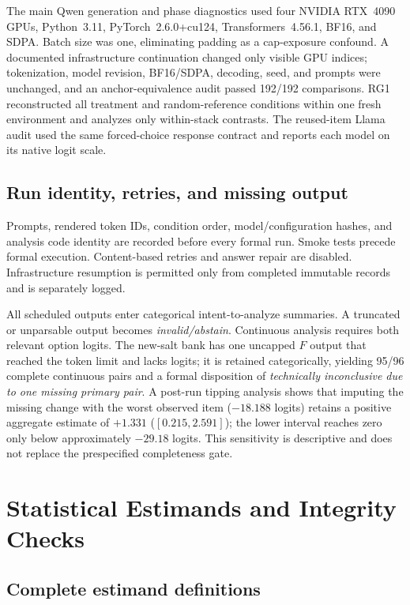 \documentclass[letterpaper]{article}
\begin{document}
The main Qwen generation and phase diagnostics used four NVIDIA RTX~4090 GPUs, Python~3.11, PyTorch~2.6.0+cu124, Transformers~4.56.1, BF16, and SDPA.  Batch size was one, eliminating padding as a cap-exposure confound.  A documented infrastructure continuation changed only visible GPU indices; tokenization, model revision, BF16/SDPA, decoding, seed, and prompts were unchanged, and an anchor-equivalence audit passed 192/192 comparisons.  RG1 reconstructed all treatment and random-reference conditions within one fresh environment and analyzes only within-stack contrasts.  The reused-item Llama audit used the same forced-choice response contract and reports each model on its native logit scale.

\subsection{Run identity, retries, and missing output}

Prompts, rendered token IDs, condition order, model/configuration hashes, and analysis code identity are recorded before every formal run.  Smoke tests precede formal execution.  Content-based retries and answer repair are disabled.  Infrastructure resumption is permitted only from completed immutable records and is separately logged.

All scheduled outputs enter categorical intent-to-analyze summaries.  A truncated or unparsable output becomes \emph{invalid/abstain}.  Continuous analysis requires both relevant option logits.  The new-salt bank has one uncapped $F$ output that reached the token limit and lacks logits; it is retained categorically, yielding 95/96 complete continuous pairs and a formal disposition of \emph{technically inconclusive due to one missing primary pair}.  A post-run tipping analysis shows that imputing the missing change with the worst observed item ($-18.188$ logits) retains a positive aggregate estimate of $+1.331$ ($[0.215,2.591]$); the lower interval reaches zero only below approximately $-29.18$ logits.  This sensitivity is descriptive and does not replace the prespecified completeness gate.

\section{Statistical Estimands and Integrity Checks}
\label{supp:inference}

\subsection{Complete estimand definitions}
\end{document}
